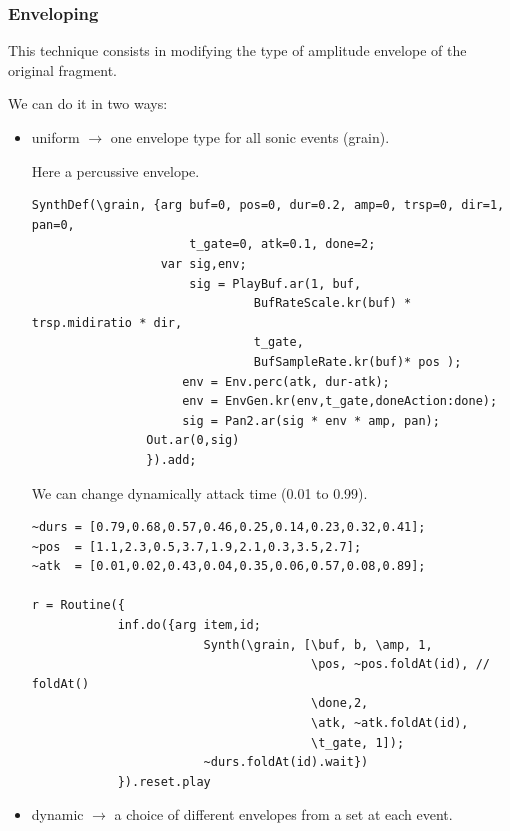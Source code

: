\subsubsection{Enveloping}\label{enveloping}

This technique consists in modifying the type of amplitude envelope of the original fragment.

We can do it in two ways:

\begin{itemize}
\tightlist
\item uniform \(\rightarrow\) one envelope type for all sonic events (grain).

  Here a percussive envelope.

\begin{lstlisting}[frame=single, caption=Percussive grain model] 
SynthDef(\grain, {arg buf=0, pos=0, dur=0.2, amp=0, trsp=0, dir=1, pan=0,
	                  t_gate=0, atk=0.1, done=2;
                  var sig,env;
                      sig = PlayBuf.ar(1, buf,
                               BufRateScale.kr(buf) * trsp.midiratio * dir,
                               t_gate,
                               BufSampleRate.kr(buf)* pos );
                     env = Env.perc(atk, dur-atk);
                     env = EnvGen.kr(env,t_gate,doneAction:done);
                     sig = Pan2.ar(sig * env * amp, pan);
                Out.ar(0,sig)
                }).add;
\end{lstlisting}

We can change dynamically attack time (0.01 to 0.99).

\begin{lstlisting}[frame=single] 
~durs = [0.79,0.68,0.57,0.46,0.25,0.14,0.23,0.32,0.41];       
~pos  = [1.1,2.3,0.5,3.7,1.9,2.1,0.3,3.5,2.7];
~atk  = [0.01,0.02,0.43,0.04,0.35,0.06,0.57,0.08,0.89];      

r = Routine({
            inf.do({arg item,id;  
                        Synth(\grain, [\buf, b, \amp, 1,
                                       \pos, ~pos.foldAt(id), // foldAt()
                                       \done,2, 
                                       \atk, ~atk.foldAt(id),
                                       \t_gate, 1]);
		                ~durs.foldAt(id).wait})
            }).reset.play
\end{lstlisting}

\item dynamic \(\rightarrow\) a choice of different envelopes from a set at each event.


\end{itemize}
